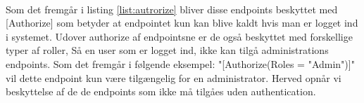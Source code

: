 \\

Som det fremgår i listing \ref{list:autrorize} bliver disse endpoints beskyttet med [Authorize] som betyder at
endpointet kun kan blive kaldt hvis man er logget ind i systemet. Udover authorize af endpointsne er de også beskyttet 
med forskellige typer af roller, Så en user som er logget ind, ikke kan tilgå administrations endpoints.
Som det fremgår i følgende eksempel: "[Authorize(Roles = "Admin")]" vil dette endpoint kun være tilgængelig
for en administrator. Herved opnår vi beskyttelse af de de endpoints som ikke må tilgåes uden authentication.